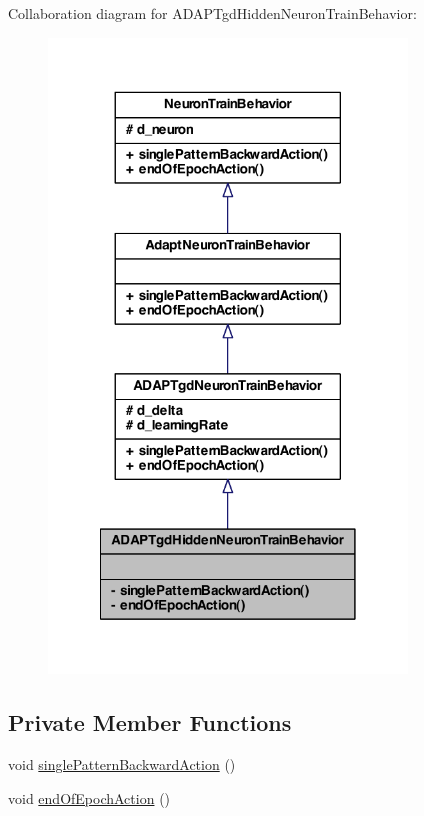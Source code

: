 Collaboration diagram for ADAPTgdHiddenNeuronTrainBehavior:
\nopagebreak
\begin{figure}[H]
\begin{center}
\leavevmode
\includegraphics[width=270pt]{class_a_d_a_p_tgd_hidden_neuron_train_behavior__coll__graph}
\end{center}
\end{figure}
\subsection*{Private Member Functions}
\begin{DoxyCompactItemize}
\item 
void \hyperlink{class_a_d_a_p_tgd_hidden_neuron_train_behavior_adb273e3b254899151634329da2999c06}{singlePatternBackwardAction} ()
\item 
void \hyperlink{class_a_d_a_p_tgd_hidden_neuron_train_behavior_a472a7f8c82e795353fb4acf5dfcd17d4}{endOfEpochAction} ()
\end{DoxyCompactItemize}



